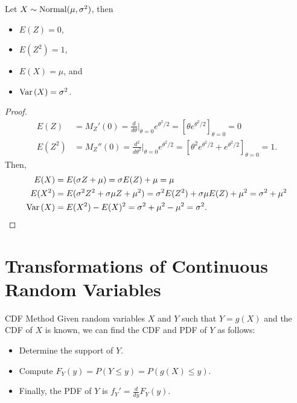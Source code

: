 \begin{cor}
    Let $X \sim \mathrm{Normal}(\mu, \sigma^2)$, then
    \begin{itemize}
        \item $E(Z) = 0$,
        \item $E(Z^2) = 1$,
        \item $E(X) = \mu$, and
        \item $\operatorname{Var}\left(X\right) = \sigma^2$.
    \end{itemize}
\end{cor}

\begin{proof}
    \begin{align*}
        E(Z) &= M_{Z}'(0) = \frac{d}{d\theta}\big\rvert_{\theta=0}e^{\theta^2/2} = \left[\theta e^{\theta^2/2}\right]_{\theta = 0} = 0 \\
        E(Z^2) &= M_{Z}''(0) = \frac{d^2}{d\theta^2}\big\rvert_{\theta=0}e^{\theta^2/2} = \left[\theta^2 e^{\theta^2/2} + e^{\theta^2/2}\right]_{\theta = 0} = 1.
    \end{align*}
    Then,
    \begin{align*}
        E(X) &= E(\sigma Z + \mu) = \sigma E(Z) + \mu = \mu \\
        E(X^2) &= E(\sigma^2Z^2 + \sigma\mu Z + \mu^2) = \sigma^2E(Z^2) + \sigma\mu E(Z) + \mu^2 = \sigma^2 + \mu^2 \\
        \operatorname{Var}\left(X\right) &= E(X^2) - E(X)^2 = \sigma^2 + \mu^2 - \mu^2 = \sigma^2.
    \end{align*}
\end{proof}

\section{Transformations of Continuous Random Variables}

\begin{defn}{CDF Method}\label{cdf-method}\proofbreak
    Given random variables $X$ and $Y$ such that $Y = g(X)$ and the CDF of $X$ is known, we can find the CDF and PDF of $Y$ as follows:
    \begin{itemize}
        \item Determine the support of $Y$.
        \item Compute $F_Y(y) = P(Y \leq y) = P(g(X) \leq y)$.
        \item Finally, the PDF of $Y$ is $f_Y' = \frac{d}{dy}F_Y(y)$.
    \end{itemize}
\end{defn}

